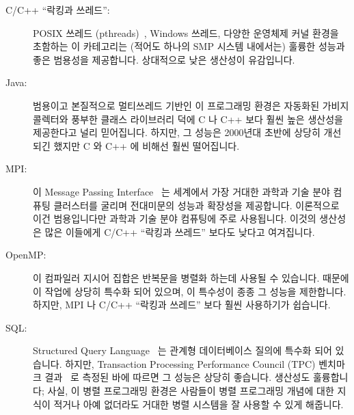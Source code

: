\begin{description}
\item[C/C++ ``락킹과 쓰레드'':] POSIX 쓰레드
	(pthreads)~\cite{OpenGroup1997pthreads}, Windows 쓰레드, 다양한
	운영체제 커널 환경을 초함하는 이 카테고리는 (적어도 하나의 SMP 시스템
	내에서는) 훌륭한 성능과 좋은 범용성을 제공합니다.
	상대적으로 낮은 생산성이 유감입니다.
\item[Java:] 범용이고 본질적으로 멀티쓰레드 기반인 이 프로그래밍 환경은
	자동화된 가비지 콜렉터와 풍부한 클래스 라이브러리 덕에 C 나 C++ 보다
	훨씬 높은 생산성을 제공한다고 널리 믿어집니다.
	하지만, 그 성능은 2000년대 초반에 상당히 개선되긴 했지만 C 와 C++ 에
	비해선 훨씬 떨어집니다.
\item[MPI:] 이 Message Passing Interface~\cite{MPIForum2008} 는 세계에서 가장
	거대한 과학과 기술 분야 컴퓨팅 클러스터를 굴리며 전대미문의 성능과
	확장성을 제공합니다.
	이론적으로 이건 범용입니다만 과학과 기술 분야 컴퓨팅에 주로 사용됩니다.
	이것의 생산성은 많은 이들에게 C/C++ ``락킹과 쓰레드'' 보다도 낮다고
	여겨집니다.

\item[OpenMP:] 이 컴파일러 지시어 집합은 반복문을 병렬화 하는데 사용될 수
	있습니다.
	때문에 이 작업에 상당히 특수화 되어 있으며, 이 특수성이 종종 그 성능을
	제한합니다.
	하지만, MPI 나 C/C++ ``락킹과 쓰레드'' 보다 훨씬 사용하기가 쉽습니다.
\item[SQL:] Structured Query Language~\cite{DIS9075SQL92} 는 관계형
	데이터베이스 질의에 특수화 되어 있습니다.
	하지만, Transaction Processing Performance Council (TPC) 벤치마크
	결과~\cite{TPC} 로 측정된 바에 따르면 그 성능은 상당히 좋습니다.
	생산성도 훌륭합니다; 사실, 이 병렬 프로그래밍 환경은 사람들이 병렬
	프로그래밍 개념에 대한 지식이 적거나 아예 없더라도 거대한 병렬 시스템을
	잘 사용할 수 있게 해줍니다.
\iffalse


\end{description}
